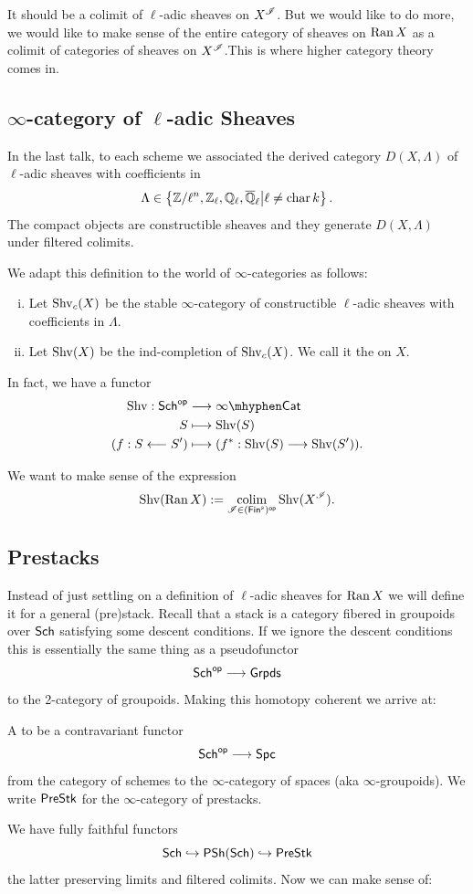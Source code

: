 \documentclass[oneside]{amsart}
\begin{document}
It should be a colimit of $\ell$-adic sheaves on $X^{\mathscr{I}}$. But we would like to do more, we would like to make sense of the entire category of sheaves on $\operatorname{Ran} X$ as a colimit of categories of sheaves on $X^{\mathscr{I}}$.This is where higher category theory comes in.

\subsection{\texorpdfstring{$\infty$-category of $\ell$-adic Sheaves}{Infinity-category of l-adic Sheaves}}
In the last talk, to each scheme we associated the derived category $D(X,\Lambda)$ of $\ell$-adic sheaves with coefficients in
\[
\Lambda\in \left\{ \mathbb Z /\ell^{n}, \mathbb Z_\ell, \mathbb Q_\ell, \overline{\mathbb Q}_\ell \middle| \ell\neq \operatorname{char} k \right\} .
\] 
The compact objects are constructible sheaves and they generate $D(X,\Lambda)$ under filtered colimits.

We adapt this definition to the world of $\infty$-categories as follows:
\begin{enumerate}[(i)]
	\item Let $\operatorname{Shv}_c(X)$ be the stable $\infty$-category of constructible $\ell$-adic sheaves with coefficients in $\Lambda$.
	\item Let $\operatorname{Shv}(X)$ be the ind-completion of $\operatorname{Shv}_c(X)$. We call it the  on $X$.
\end{enumerate}

In fact, we have a functor
\begin{align*}
	\Shv:\Sch\op &\longrightarrow \iCat \\
	S &\longmapsto \Shv(S) \\
	(f:S\from S') &\longmapsto (f^{*}:\Shv(S)\to \Shv(S')).
\end{align*}

We want to make sense of the expression
\[
\Shv(\Ran X) \defeq \colim_{\CI\in (\Fins)\op}\Shv(X^{\CI}).
\] 

\subsection{Prestacks}
Instead of just settling on a definition of $\ell$-adic sheaves for $\operatorname{Ran} X$ we will define it for a general (pre)stack. Recall that a stack is a category fibered in groupoids over $\mathsf{Sch}$ satisfying some descent conditions. If we ignore the descent conditions this is essentially the same thing as a pseudofunctor
\[
	\Sch\op \to \cat{Grpds}
\] 
to the 2-category of groupoids. Making this homotopy coherent we arrive at:
\begin{definition}
	A  to be a contravariant functor
	\[
	\Sch\op\to \Spc
	\] 
	from the category of schemes to the $\infty$-category of spaces (aka $\infty$-groupoids). We write $\mathsf{PreStk}$ for the $\infty$-category of prestacks.
\end{definition}
We have fully faithful functors
\[
\mathsf{Sch} \hookrightarrow \mathsf{PSh}(\mathsf{Sch}) \hookrightarrow \mathsf{PreStk}
\] 
the latter preserving limits and filtered colimits. Now we can make sense of:
\end{document}

